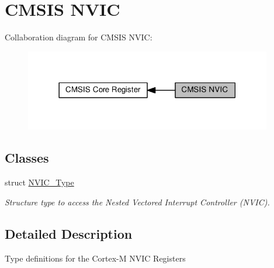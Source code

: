 \hypertarget{group___c_m_s_i_s___n_v_i_c}{}\section{C\+M\+S\+IS N\+V\+IC}
\label{group___c_m_s_i_s___n_v_i_c}
Collaboration diagram for C\+M\+S\+IS N\+V\+IC\+:\nopagebreak
\begin{figure}[H]
\begin{center}
\leavevmode
\includegraphics[width=306pt]{group___c_m_s_i_s___n_v_i_c}
\end{center}
\end{figure}
\subsection*{Classes}
\begin{DoxyCompactItemize}
\item 
struct \hyperlink{struct_n_v_i_c___type}{N\+V\+I\+C\+\_\+\+Type}
\begin{DoxyCompactList}\small\item\em Structure type to access the Nested Vectored Interrupt Controller (N\+V\+IC). \end{DoxyCompactList}\end{DoxyCompactItemize}


\subsection{Detailed Description}
Type definitions for the Cortex-\/M N\+V\+IC Registers 